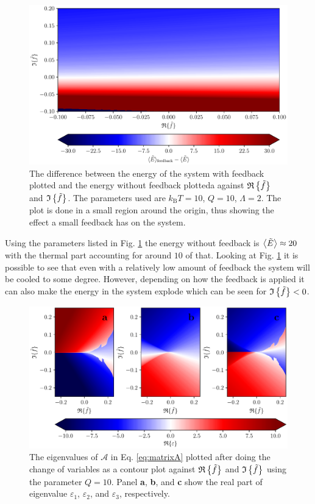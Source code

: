 \begin{figure}
    \centering
    \includegraphics[width=\textwidth]{figures/energyFeedbackDifference.pdf}
    \caption{\small The difference between the energy of the system with feedback plotted and the energy without feedback plotteda against $\mathfrak{R}\left\{\tilde{f}\right\}$ and $\mathfrak{I}\left\{\tilde{f}\right\}$. The parameters used are $k_\text{B}T = 10$, $Q = 10$, $\Lambda = 2$. The plot is done in a small region around the origin, thus showing the effect a small feedback has on the system. }
    \label{fig:energyFeedbackDifference}
\end{figure}

Using the parameters listed in Fig. \ref{fig:energyFeedbackDifference} the energy without feedback is $\expval{\tilde{E}} \approx 20$ with the thermal part accounting for around $10$ of that. Looking at Fig. \ref{fig:energyFeedbackDifference} it is possible to see that even with a relatively low amount of feedback the system will be cooled to some degree. However, depending on how the feedback is applied it can also make the energy in the system explode which can be seen for $\mathfrak{I}\left\{\tilde{f}\right\} < 0$.

\begin{figure}
    \centering
    \includegraphics[width=\textwidth]{figures/eigenvaluesSecondMomenta.pdf}
    \caption{The eigenvalues of $\mathcal{A}$ in Eq. \eqref{eq:matrixA} plotted after doing the change of variables as a contour plot against $\mathfrak{R}\left\{\tilde{f}\right\}$ and $\mathfrak{I}\left\{\tilde{f}\right\}$ using the parameter $Q=10$. Panel \textbf{a}, \textbf{b}, and \textbf{c} show the real part of eigenvalue $\varepsilon_1$, $\varepsilon_2$, and $\varepsilon_3$, respectively.}
    \label{fig:eigenvalueSecondMomenta}
\end{figure}

